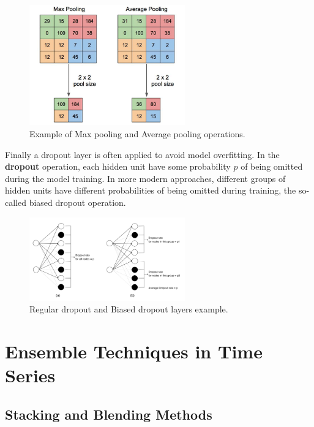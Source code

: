 \begin{figure}[H] 
    \centering
    \includegraphics[width=0.6\textwidth]{Machine_learning_thesis/Images/Max pooling and Average pooling.png}
    \caption{Example of Max pooling and Average pooling operations.} 
    \label{fig:Max pooling and Average pooling} 
\end{figure}
Finally a dropout layer is often applied to avoid model overfitting. In the \textbf{dropout} operation, each hidden unit have some probability $p$ of being omitted
during the model training. In more modern approaches, different groups of hidden units have different probabilities of being omitted during training, the so-called biased dropout operation.
\begin{figure}[H] 
    \centering
    \includegraphics[width=0.6\textwidth]{Machine_learning_thesis/Images/Dropout.png}
    \caption{Regular dropout and Biased dropout layers example.} 
    \label{fig:Regular dropout and Biased dropout} 
\end{figure}


\section{Ensemble Techniques in Time Series} 
\label{Sec: ensemble learning}
\subsection{Stacking and Blending Methods} 
